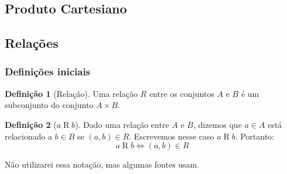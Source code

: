 \documentclass{article}
\theoremstyle{theorem}
\theoremstyle{lemma}
\theoremstyle{definition}
\newtheorem{definicao}{Definição}[section]
\theoremstyle{remark}
\begin{document}
\subsection{Produto Cartesiano}
\subsection{Relações}
\subsubsection{Definições iniciais}
\begin{definicao}[Relação]
	Uma relação $R$ entre os conjuntos $A$ e $B$ é um subconjunto do conjunto $A\times B$.
\end{definicao}
\begin{definicao}[$a\mathrel{R}b$]
	Dado uma relação entre $A$ e $B$, dizemos que $a\in A$ está relacionado a $b\in B$ se $(a,b) \in R$. Escrevemos nesse caso $a\mathrel{R}b$. Portanto:
	$$ a\mathrel{R}b \iff  (a,b) \in R$$

	Não utilizarei essa notação, mas algumas fontes usam.
\end{definicao}
\end{document}
